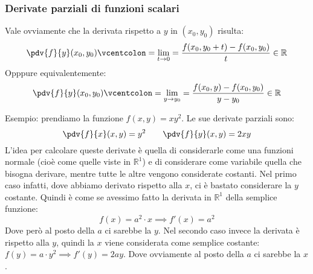 \subsubsection{Derivate parziali di funzioni scalari}
Vale ovviamente che la derivata rispetto a $y$ in $(x_0, y_0)$ risulta:
\begin{equation*}
		\pdv{f}{y} (x_0, y_0) \vcentcolon = \lim_{t \to 0} = 
		\dfrac{f(x_0, y_0 + t) - f(x_0, y_0)}{t} \in \mathbb{R}
\end{equation*}
Opppure equivalentemente:
\begin{equation*}
	\pdv{f}{y} (x_0, y_0) \vcentcolon = \lim_{y \to y_0} = \dfrac{f(x_0, y) - 
	f(x_0, y_0)}{y - y_0} \in \mathbb{R}
\end{equation*}

Esempio: prendiamo la funzione $f(x, y) = xy^2$. Le sue derivate parziali sono:
\begin{equation*}
	\pdv{f}{x} (x, y) = y^2 \qquad \pdv{f}{y} (x, y) = 2xy
\end{equation*}
L'idea per calcolare queste derivate è quella di considerarle come una funzioni
normale (cioè come quelle viste in $\mathbb{R}^1$) e di considerare come 
variabile quella che bisogna derivare, mentre tutte le altre vengono 
considerate costanti. Nel primo caso infatti, dove abbiamo derivato rispetto 
alla $x$, ci è bastato considerare la $y$ costante. Quindi è come se avessimo 
fatto la derivata in $\mathbb{R}^1$ della semplice funzione:
\begin{equation*}
	f(x) = a^2 \cdot x \implies f'(x) = a^2
\end{equation*}
Dove però al posto della $a$ ci sarebbe la $y$. Nel secondo caso invece la 
derivata è rispetto alla $y$, quindi la $x$ viene considerata come semplice 
costante: $f(y) = a \cdot y^2 \implies f'(y) = 2ay$. Dove ovviamente al posto 
della $a$ ci sarebbe la $x$.\bigbreak

